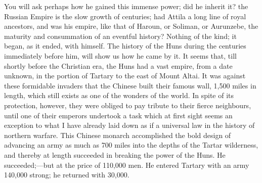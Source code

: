 You will ask perhaps how he
gained this immense power; did he inherit it? the Russian Empire is
the slow growth of centuries; had Attila a long line of royal
ancestors, and was his empire, like that of Haroun, or Soliman, or
Aurunzebe, the maturity and consummation of an eventful history?
Nothing of the kind; it began, as it ended, with himself. The history
of the Huns during the centuries immediately before him, will show us
how he came by it. It seems that, till shortly before the Christian
era, the Huns had a vast empire, from a date unknown, in the portion
of Tartary to the east of Mount Altai. It was against these formidable
invaders that the Chinese built their famous wall, 1,500 miles in
length, which still exists as one of the wonders of the world. In
spite of its protection, however, they were obliged to pay tribute to
their fierce neighbours, until one of their emperors undertook a
task which at first sight seems an exception to what I have already
laid down as if a universal law in the history of northern warfare.
This Chinese monarch accomplished the bold design of advancing an army
as much as 700 miles into the depths of the Tartar wilderness, and
thereby at length succeeded in breaking the power of the Huns. He
succeeded;—but at the price of 110,000 men. He entered Tartary with
an army 140,000 strong; he returned with 30,000.

